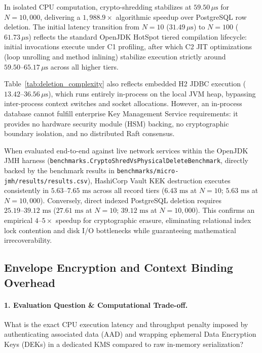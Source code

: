In isolated CPU computation, crypto-shredding stabilizes at $59.50\,\mu\text{s}$ for $N = 10{,}000$, delivering a $1{,}988.9\times$ algorithmic speedup over PostgreSQL row deletion. The initial latency transition from $N = 10$ ($31.49\,\mu\text{s}$) to $N = 100$ ($61.73\,\mu\text{s}$) reflects the standard OpenJDK HotSpot tiered compilation lifecycle: initial invocations execute under C1 profiling, after which C2 JIT optimizations (loop unrolling and method inlining) stabilize execution strictly around $59.50\text{--}65.17\,\mu\text{s}$ across all higher tiers.

Table~\ref{tab:deletion_complexity} also reflects embedded H2 JDBC execution ($13.42\text{--}36.56\,\mu\text{s}$), which runs entirely in-process on the local JVM heap, bypassing inter-process context switches and socket allocations. However, an in-process database cannot fulfill enterprise Key Management Service requirements: it provides no hardware security module (HSM) backing, no cryptographic boundary isolation, and no distributed Raft consensus.

When evaluated end-to-end against live network services within the OpenJDK JMH harness (\texttt{benchmarks.CryptoShredVsPhysicalDeleteBenchmark}, directly backed by the benchmark results in \texttt{benchmarks/micro-jmh/results/results.csv}), HashiCorp Vault KEK destruction executes consistently in $5.63\text{--}7.65\text{~ms}$ across all record tiers ($6.43\text{~ms}$ at $N = 10$; $5.63\text{~ms}$ at $N = 10{,}000$). Conversely, direct indexed PostgreSQL deletion requires $25.19\text{--}39.12\text{~ms}$ ($27.61\text{~ms}$ at $N = 10$; $39.12\text{~ms}$ at $N = 10{,}000$). This confirms an empirical $4\text{--}5\times$ speedup for cryptographic erasure, eliminating relational index lock contention and disk I/O bottlenecks while guaranteeing mathematical irrecoverability.

\subsection{Envelope Encryption and Context Binding Overhead}

\paragraph{1. Evaluation Question \& Computational Trade-off.}
What is the exact CPU execution latency and throughput penalty imposed by authenticating associated data (AAD) and wrapping ephemeral Data Encryption Keys (DEKs) in a dedicated KMS compared to raw in-memory serialization?


